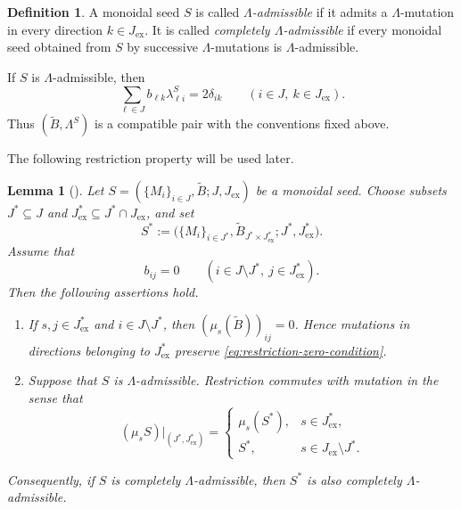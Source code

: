 \documentclass[12pt, reqno]{amsart}
\theoremstyle{plain}
\newtheorem{lemma}[theorem]{Lemma}
\theoremstyle{definition}
\newtheorem{definition}[theorem]{Definition}
\numberwithin{equation}{section}
\begin{document}
\begin{definition}\label{def:Lambda-admissible}
    A monoidal seed \(S\) is called \emph{\(\Lambda\)-admissible} if it
    admits a \(\Lambda\)-mutation in every direction
    \(k\in J_{\mathrm{ex}}\). It is called \emph{completely
    \(\Lambda\)-admissible} if every monoidal seed obtained from \(S\) by
    successive \(\Lambda\)-mutations is \(\Lambda\)-admissible.
\end{definition}

If \(S\) is \(\Lambda\)-admissible, then
\begin{equation}\label{eq:monoidal-seed-compatibility}
    \sum_{\ell\in J}b_{\ell k}\lambda_{\ell i}^S
    =2\delta_{ik}
    \qquad (i\in J,\ k\in J_{\mathrm{ex}}).
\end{equation}
Thus \((\widetilde B,\Lambda^S)\) is a compatible pair with the
conventions fixed above.

The following restriction property will be used later.

\begin{lemma}[{\cite[Lemma~7.15]{kashiwara2024monoidal}}]\label{lem:subseed}
    Let
    \(S=(\{M_i\}_{i\in J},\widetilde B;J,J_{\mathrm{ex}})\) be a
    monoidal seed. Choose subsets \(J^*\subseteq J\) and
    \(J_{\mathrm{ex}}^*\subseteq J^*\cap J_{\mathrm{ex}}\), and set
    \begin{equation}\label{eq:restricted-monoidal-seed}
        S^*
        :=\bigl(
            \{M_i\}_{i\in J^*},
            \widetilde B_{J^*\times J_{\mathrm{ex}}^*};
            J^*,J_{\mathrm{ex}}^*
        \bigr).
    \end{equation}
    Assume that
    \begin{equation}\label{eq:restriction-zero-condition}
        b_{ij}=0
        \qquad
        (i\in J\setminus J^*,\ j\in J_{\mathrm{ex}}^*).
    \end{equation}
    Then the following assertions hold.

    \begin{enumerate}
        \item If \(s,j\in J_{\mathrm{ex}}^*\) and
        \(i\in J\setminus J^*\), then
        \((\mu_s(\widetilde B))_{ij}=0\). Hence mutations in directions
        belonging to \(J_{\mathrm{ex}}^*\) preserve
        \eqref{eq:restriction-zero-condition}.

        \item Suppose that \(S\) is \(\Lambda\)-admissible. Restriction
        commutes with mutation in the sense that
        \begin{equation}\label{eq:mutation-commutes-with-restriction}
            (\mu_sS)|_{(J^*,J_{\mathrm{ex}}^*)}
            =\begin{cases}
                \mu_s(S^*),
                & s\in J_{\mathrm{ex}}^*,\\
                S^*,
                & s\in J_{\mathrm{ex}}\setminus J^*.
            \end{cases}
        \end{equation}
    \end{enumerate}
    Consequently, if \(S\) is completely \(\Lambda\)-admissible, then
    \(S^*\) is also completely \(\Lambda\)-admissible.
\end{lemma}
\end{document}
